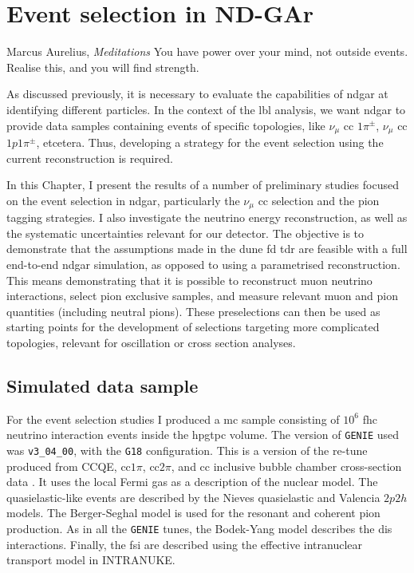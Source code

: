 \chapter{Event selection in ND-GAr}
\label{chapter:gar_selection}

\begin{chapquote}{Marcus Aurelius, \textit{Meditations}}
	You have power over your mind, not outside events. Realise this, and you will find strength.
\end{chapquote}

As discussed previously, it is necessary to evaluate the capabilities of \gls{ndgar} at identifying different particles. In the context of the \gls{lbl} analysis, we want \gls{ndgar} to provide data samples containing events of specific topologies, like $\nu_{\mu}$ \gls{cc} $1\pi^{\pm}$, $\nu_{\mu}$ \gls{cc} $1p1\pi^{\pm}$, etcetera. Thus, developing a strategy for the event selection using the current reconstruction is required.

In this Chapter, I present the results of a number of preliminary studies focused on the event selection in \gls{ndgar}, particularly the $\nu_{\mu}$ \gls{cc} selection and the pion tagging strategies. I also investigate the neutrino energy reconstruction, as well as the systematic uncertainties relevant for our detector. The objective is to demonstrate that the assumptions made in the \gls{dune} \gls{fd} \gls{tdr} \cite{DUNE2020TDR2} are feasible with a full end-to-end \gls{ndgar} simulation, as opposed to using a parametrised reconstruction. This means demonstrating that it is possible to reconstruct muon neutrino interactions, select pion exclusive samples, and measure relevant muon and pion quantities (including neutral pions). These preselections can then be used as starting points for the development of selections targeting more complicated topologies, relevant for oscillation or cross section analyses.

\section{Simulated data sample}
\label{sec:gar_data}

For the event selection studies I produced a \gls{mc} sample consisting of $10^{6}$ \gls{fhc} neutrino interaction events inside the \gls{hpgtpc} volume. The version of \texttt{GENIE} used was \texttt{v3_04_00}, with the \texttt{G18} configuration. This is a version of the re-tune produced from CCQE, \gls{cc}$1\pi$, \gls{cc}$2\pi$, and \gls{cc} inclusive bubble chamber cross-section data \cite{GENIE2021}. It uses the local Fermi gas \cite{Chiang1989} as a description of the nuclear model. The quasielastic-like events are described by the Nieves quasielastic \cite{Nieves2004} and Valencia $2p2h$ \cite{Nieves2011} models. The Berger-Seghal model \cite{Berger2007,Berger2008} is used for the resonant and coherent pion production. As in all the \texttt{GENIE} tunes, the Bodek-Yang model \cite{Bodek2002} describes the \gls{dis} interactions. Finally, the \gls{fsi} are described using the effective intranuclear transport model in INTRANUKE.

